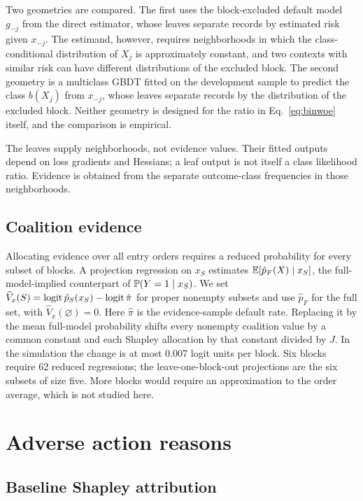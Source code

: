 Two geometries are compared. The first uses the block-excluded default model $g_{-j}$ from the direct estimator, whose leaves separate records by estimated risk given $x_{-j}$. The estimand, however, requires neighborhoods in which the class-conditional distribution of $X_j$ is approximately constant, and two contexts with similar risk can have different distributions of the excluded block. The second geometry is a multiclass GBDT fitted on the development sample to predict the class $b(X_j)$ from $x_{-j}$, whose leaves separate records by the distribution of the excluded block. Neither geometry is designed for the ratio in Eq.~\eqref{eq:binwoe} itself, and the comparison is empirical.

The leaves supply neighborhoods, not evidence values. Their fitted outputs depend on loss gradients and Hessians; a leaf output is not itself a class likelihood ratio. Evidence is obtained from the separate outcome-class frequencies in those neighborhoods.

\subsection{Coalition evidence}

Allocating evidence over all entry orders requires a reduced probability for every subset of blocks. A projection regression on $x_S$ estimates $\mathbb E[\hat p_F(X)\mid x_S]$, the full-model-implied counterpart of $\mathbb P(Y=1\mid x_S)$. We set $\widehat V_x(S)=\operatorname{logit}\tilde p_S(x_S)-\operatorname{logit}\hat\pi$ for proper nonempty subsets and use $\hat p_F$ for the full set, with $\widehat V_x(\varnothing)=0$. Here $\hat\pi$ is the evidence-sample default rate. Replacing it by the mean full-model probability shifts every nonempty coalition value by a common constant and each Shapley allocation by that constant divided by $J$. In the simulation the change is at most 0.007 logit units per block. Six blocks require 62 reduced regressions; the leave-one-block-out projections are the six subsets of size five. More blocks would require an approximation to the order average, which is not studied here.

\section{Adverse action reasons}\label{sec:aarc}

\subsection{Baseline Shapley attribution}

